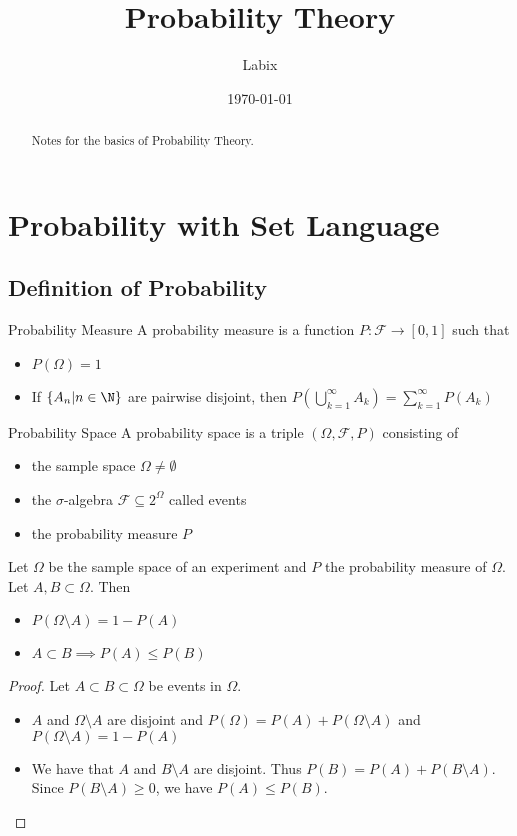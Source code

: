 \documentclass[a4paper]{article}
\title{Probability Theory}
\author{Labix}
\date{\today}
\begin{document}
\maketitle
\begin{abstract}
Notes for the basics of Probability Theory. 
\end{abstract}
\tableofcontents
\pagebreak

\section{Probability with Set Language}
\subsection{Definition of Probability}
\begin{defn}{Probability Measure}{} A probability measure is a function $P:\mathcal{F}\to[0,1]$ such that 
\begin{itemize}
\item $P(\Omega)=1$
\item If $\{A_n|n\in\N\}$ are pairwise disjoint, then $P(\bigcup_{k=1}^\infty A_k)=\sum_{k=1}^{\infty}P(A_k)$
\end{itemize}
\end{defn}

\begin{defn}{Probability Space}{} A probability space is a triple $(\Omega,\mathcal{F},P)$ consisting of 
\begin{itemize}
\item the sample space $\Omega\neq\emptyset$
\item the $\sigma$-algebra $\mathcal{F}\subseteq 2^{\Omega}$ called events
\item the probability measure $P$
\end{itemize}
\end{defn}

\begin{prp}{}{} Let $\Omega$ be the sample space of an experiment and $P$ the probability measure of $\Omega$. Let $A,B\subset\Omega$. Then 
\begin{itemize}
\item $P(\Omega\setminus A)=1-P(A)$
\item $A\subset B\implies P(A)\leq P(B)$
\end{itemize} \tcbline
\begin{proof} Let $A\subset B\subset\Omega$ be events in $\Omega$. 
\begin{itemize}
\item $A$ and $\Omega\setminus A$ are disjoint and $P(\Omega)=P(A)+P(\Omega\setminus A)$ and $P(\Omega\setminus A)=1-P(A)$
\item We have that $A$ and $B\setminus A$ are disjoint. Thus $P(B)=P(A)+P(B\setminus A)$. Since $P(B\setminus A)\geq 0$, we have $P(A)\leq P(B)$.  
\end{itemize}
\end{proof}
\end{prp}
\end{document}
